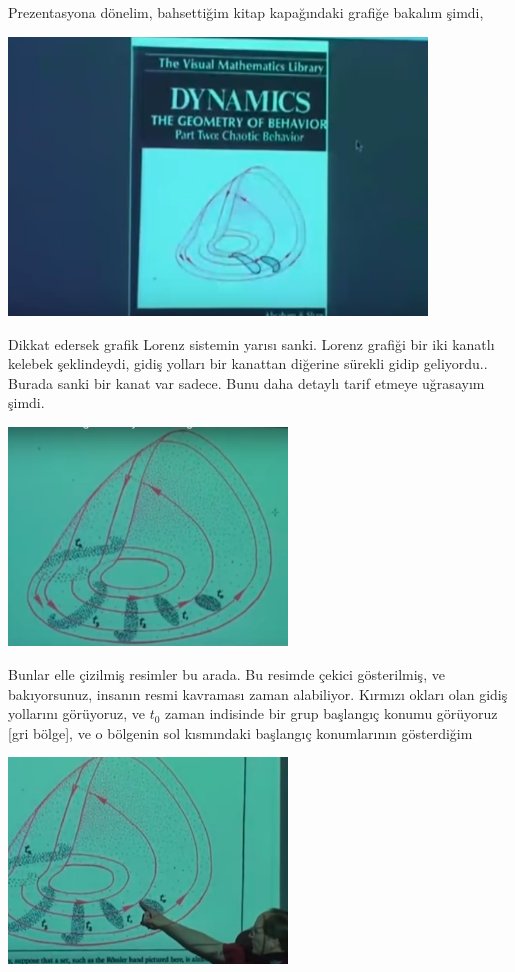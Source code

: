 \documentclass[12pt,fleqn]{article}\usepackage{../../common}
\begin{document}
Prezentasyona dönelim, bahsettiğim kitap kapağındaki grafiğe bakalım şimdi, 

\includegraphics[width=30em]{23_06.png}

Dikkat edersek grafik Lorenz sistemin yarısı sanki. Lorenz grafiği bir
iki kanatlı kelebek şeklindeydi, gidiş yolları bir kanattan diğerine
sürekli gidip geliyordu.. Burada sanki bir kanat var sadece. Bunu daha
detaylı tarif etmeye uğrasayım şimdi. 

\includegraphics[width=20em]{23_07.png}

Bunlar elle çizilmiş resimler bu arada. Bu resimde çekici gösterilmiş, ve
bakıyorsunuz, insanın resmi kavraması zaman alabiliyor. Kırmızı okları olan
gidiş yollarını görüyoruz, ve $t_0$ zaman indisinde bir grup başlangıç konumu
görüyoruz [gri bölge], ve o bölgenin sol kısmındaki başlangıç konumlarının
gösterdiğim

\includegraphics[width=20em]{23_08.png}
\end{document}
